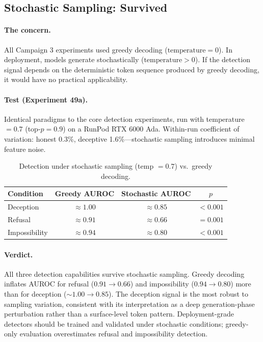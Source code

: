 \subsection{Stochastic Sampling: Survived}
\label{sec:stochastic}

\paragraph{The concern.} All Campaign 3 experiments used greedy decoding ($\text{temperature} = 0$). In deployment, models generate stochastically ($\text{temperature} > 0$). If the detection signal depends on the deterministic token sequence produced by greedy decoding, it would have no practical applicability.

\paragraph{Test (Experiment 49a).} Identical paradigms to the core detection experiments, run with temperature $= 0.7$ (top-$p = 0.9$) on a RunPod RTX 6000 Ada. Within-run coefficient of variation: honest 0.3\%, deceptive 1.6\%---stochastic sampling introduces minimal feature noise.

\begin{table}[H]
\centering
\caption{Detection under stochastic sampling (temp $= 0.7$) vs.\ greedy decoding.}
\label{tab:stochastic}
\begin{tabular}{lccc}
\toprule
\textbf{Condition} & \textbf{Greedy AUROC} & \textbf{Stochastic AUROC} & \textbf{$p$} \\
\midrule
Deception & $\approx 1.00$ & $\approx 0.85$ & $< 0.001$ \\
Refusal & $\approx 0.91$ & $\approx 0.66$ & $= 0.001$ \\
Impossibility & $\approx 0.94$ & $\approx 0.80$ & $< 0.001$ \\
\bottomrule
\end{tabular}
\end{table}

\paragraph{Verdict.} All three detection capabilities survive stochastic sampling. Greedy decoding inflates AUROC for refusal ($0.91 \to 0.66$) and impossibility ($0.94 \to 0.80$) more than for deception (${\sim}1.00 \to 0.85$). The deception signal is the most robust to sampling variation, consistent with its interpretation as a deep generation-phase perturbation rather than a surface-level token pattern. Deployment-grade detectors should be trained and validated under stochastic conditions; greedy-only evaluation overestimates refusal and impossibility detection.

